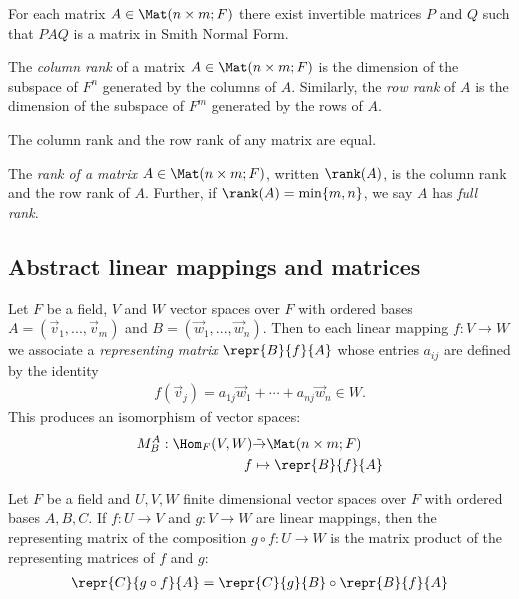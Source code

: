 \documentclass{article}
\begin{document}
\begin{theorem}[Notes 2.2.5]
    For each matrix $A\in\Mat(n\times m;F)$ there exist invertible matrices $P$
    and $Q$ such that $PAQ$ is a matrix in Smith Normal Form.
\end{theorem}

\begin{definition}
    The \emph{column rank} of a matrix $A\in\Mat(n\times m;F)$ is the dimension of
    the subspace of $F^n$ generated by the columns of $A$. Similarly, the \emph{row
        rank} of $A$ is the dimension of the subspace of $F^m$ generated by the rows
    of $A$.
\end{definition}

\begin{theorem}[Notes 2.2.8]
    The column rank and the row rank of any matrix are equal.
\end{theorem}

\begin{definition}
    The \emph{rank of a matrix} $A\in\Mat(n\times m;F)$, written $\rank(A)$, is the column rank and the
    row rank of $A$. Further, if $\rank(A) = \min\{m,n\}$, we say $A$ has
    \emph{full rank}.
\end{definition}

\subsection{Abstract linear mappings and matrices}

\begin{theorem}[Notes 2.3.1]
    Let $F$ be a field, $V$ and $W$ vector spaces over $F$ with ordered bases $A=(\vec v_1,...,\vec v_m)$
    and $B=(\vec w_1,...,\vec w_n)$. Then to each linear mapping $f:V\to W$ we associate a 
    \emph{representing matrix} $\repr{B}{f}{A}$ whose entries $a_{ij}$ are defined by the 
    identity
    \begin{align*}
        f(\vec v_j) = a_{1j}\vec w_1 + \cdots + a_{nj}\vec w_n \in W.
    \end{align*}
    This produces an isomorphism of vector spaces:
    \begin{align*}
        M^A_B:\Hom_F(V,W)           & \tilde\to \Mat(n\times m; F)\\
        f                           &   \mapsto \repr{B}{f}{A}
    \end{align*}
\end{theorem}

\begin{theorem}[Notes 2.3.2]
    Let $F$ be a field and $U,V,W$ finite dimensional vector spaces over $F$ with ordered bases 
    $A,B,C$. If $f:U\to V$ and $g:V\to W$ are linear mappings, then the representing matrix of 
    the composition $g\circ f:U\to W$ is the matrix product of the representing matrices of 
    $f$ and $g$:
    \begin{align*}
        \repr{C}{g\circ f}{A}=\repr{C}{g}{B}\circ\repr{B}{f}{A}
    \end{align*} 
\end{theorem}
\end{document}
